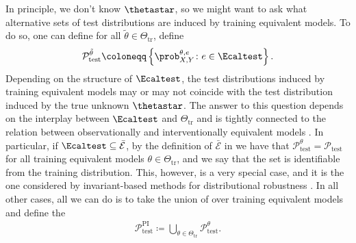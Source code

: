 In principle, we don't know $\thetastar$, so we might want to ask what alternative sets of test distributions are induced by training equivalent models. To do so, one can define for all $\tilde{\theta} \in \Theta_{\mathrm{tr}}$, define
\begin{align}\label{eq:rob-set-test}
    \mathcal{P}_{\mathrm{test}}^{\tilde{\theta}} \coloneqq \left\{ \prob_{X, Y}^{\theta, e} \colon e \in \Ecaltest \right\}.
\end{align}
Depending on the structure of $\Ecaltest$, the test distributions induced by training equivalent models may or may not coincide with the test distribution induced by the true unknown $\thetastar$.
The answer to this question depends on the interplay between $\Ecaltest$ and $\Theta_{\mathrm{tr}}$ and is tightly connected to the relation between observationally and interventionally equivalent models \cite{bongers2021foundations}.
In particular, if $\Ecaltest \subseteq \bar{\mathcal{E}}$, by the definition of $\bar{\mathcal{E}}$ in  we have that $\mathcal{P}_{\mathrm{test}}^{\theta} = \mathcal{P}_{\mathrm{test}}$ for all training equivalent models $\theta \in \Theta_{\mathrm{tr}}$, and we say that the  set is identifiable from the training distribution. 
This, however, is a very special case, and it is the one considered by invariant-based methods for distributional robustness \cite{rothenhausler2021anchor, jakobsen2022distributional, shen2023causality, christiansen2021causal}.
In all other cases, all we can do is to take the union of  over training equivalent models and define the 
\begin{align}
    \mathcal{P}_{\mathrm{test}}^{\mathrm{PI}} \coloneqq \bigcup_{\theta \in \Theta_{\mathrm{tr}}}\mathcal{P}_{\mathrm{test}}^{\theta}.
\end{align}

